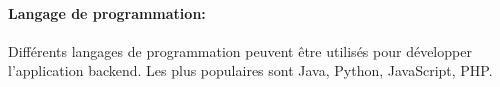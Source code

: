         \paragraph{Langage de programmation: }
        Différents langages de programmation peuvent être utilisés pour développer l'application 
        backend. Les plus populaires sont Java, Python, JavaScript, PHP.
